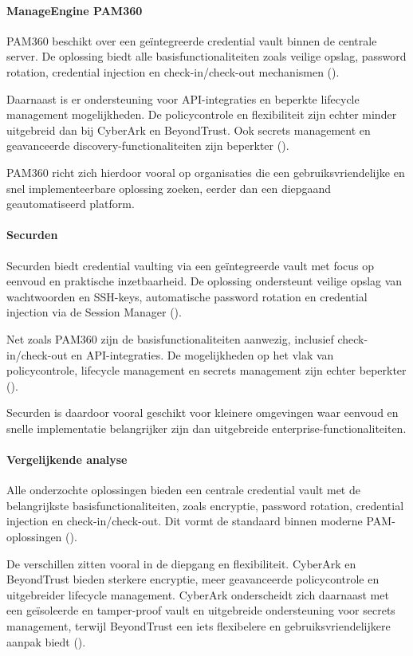 \paragraph{ManageEngine PAM360}
PAM360 beschikt over een geïntegreerde credential vault binnen de centrale server. De oplossing biedt alle basisfunctionaliteiten zoals veilige opslag, password rotation, credential injection en check-in/check-out mechanismen (\cite{pam360_architecture}).

Daarnaast is er ondersteuning voor API-integraties en beperkte lifecycle management mogelijkheden. De policycontrole en flexibiliteit zijn echter minder uitgebreid dan bij CyberArk en BeyondTrust. Ook secrets management en geavanceerde discovery-functionaliteiten zijn beperkter (\cite{pam360_architecture}).

PAM360 richt zich hierdoor vooral op organisaties die een gebruiksvriendelijke en snel implementeerbare oplossing zoeken, eerder dan een diepgaand geautomatiseerd platform.

\paragraph{Securden}
Securden biedt credential vaulting via een geïntegreerde vault met focus op eenvoud en praktische inzetbaarheid. De oplossing ondersteunt veilige opslag van wachtwoorden en SSH-keys, automatische password rotation en credential injection via de Session Manager (\cite{securden_pam,securden_session_monitoring}).

Net zoals PAM360 zijn de basisfunctionaliteiten aanwezig, inclusief check-in/check-out en API-integraties. De mogelijkheden op het vlak van policycontrole, lifecycle management en secrets management zijn echter beperkter (\cite{securden_pam,securden_sdk_api}).

Securden is daardoor vooral geschikt voor kleinere omgevingen waar eenvoud en snelle implementatie belangrijker zijn dan uitgebreide enterprise-functionaliteiten.
\paragraph{Vergelijkende  analyse}
Alle onderzochte oplossingen bieden een centrale credential vault met de belangrijkste basisfunctionaliteiten, zoals encryptie, password rotation, credential injection en check-in/check-out. Dit vormt de standaard binnen moderne PAM-oplossingen (\cite{nist_zta_800_207}).

De verschillen zitten vooral in de diepgang en flexibiliteit. CyberArk en BeyondTrust bieden sterkere encryptie, meer geavanceerde policycontrole en uitgebreider lifecycle management. CyberArk onderscheidt zich daarnaast met een geïsoleerde en tamper-proof vault en uitgebreide ondersteuning voor secrets management, terwijl BeyondTrust een iets flexibelere en gebruiksvriendelijkere aanpak biedt (\cite{cyberark_pam_architecture,beyondtrust_passwordsafe}).

